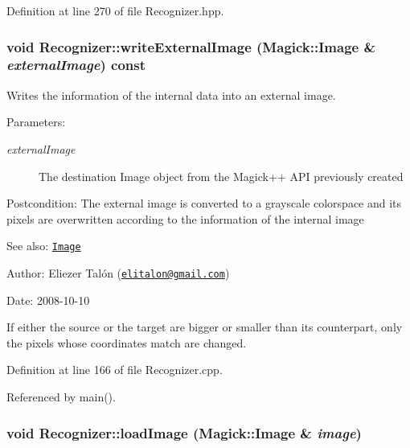 Definition at line 270 of file Recognizer.hpp.\hypertarget{class_recognizer_559f62a3e3e2d0b799bab38e975b4b67}{
\subsubsection[writeExternalImage]{\setlength{\rightskip}{0pt plus 5cm}void Recognizer::writeExternalImage (Magick::Image \& {\em externalImage}) const}}
\label{class_recognizer_559f62a3e3e2d0b799bab38e975b4b67}


Writes the information of the internal data into an external image. 

\begin{Desc}
\item[Parameters:]
\begin{description}
\item[{\em externalImage}]The destination Image object from the Magick++ API previously created\end{description}
\end{Desc}
\begin{Desc}
\item[Postcondition:]The external image is converted to a grayscale colorspace and its pixels are overwritten according to the information of the internal image\end{Desc}
\begin{Desc}
\item[See also:]\href{http://www.imagemagick.org/Magick++/Image.html}{\tt Image}\end{Desc}
\begin{Desc}
\item[Author:]Eliezer Talón (\href{mailto:elitalon@gmail.com}{\tt elitalon@gmail.com}) \end{Desc}
\begin{Desc}
\item[Date:]2008-10-10\end{Desc}
If either the source or the target are bigger or smaller than its counterpart, only the pixels whose coordinates match are changed. 

Definition at line 166 of file Recognizer.cpp.

Referenced by main().\hypertarget{class_recognizer_acc4244738f2577a0c344c3b3af22eb0}{
\subsubsection[loadImage]{\setlength{\rightskip}{0pt plus 5cm}void Recognizer::loadImage (Magick::Image \& {\em image})}}
\label{class_recognizer_acc4244738f2577a0c344c3b3af22eb0}


